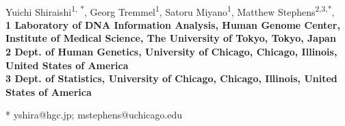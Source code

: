 \documentclass[10pt,letterpaper]{article}
\date{}
\begin{document}
\vspace*{0.35in}

\begin{flushleft}
{\Large
\textbf{}
}
\newline
\\
Yuichi Shiraishi\textsuperscript{1, *},
Georg Tremmel\textsuperscript{1},
Satoru Miyano\textsuperscript{1},
Matthew Stephens\textsuperscript{2,3,*},
\\
\bigskip
\bf{1} Laboratory of DNA Information Analysis, Human Genome Center, Institute of Medical Science, The University of Tokyo, Tokyo, Japan
\\
\bf{2} Dept. of Human Genetics, University of Chicago, Chicago, Illinois, United States of America
\\
\bf{3} Dept. of Statistics, University of Chicago, Chicago, Illinois, United States of America
\\
\bigskip

% 
%





* yshira@hgc.jp; mstephens@uchicago.edu

\end{flushleft}
\end{document}
